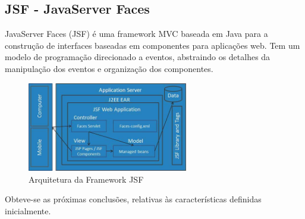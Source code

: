 \subsection{JSF - JavaServer Faces}

JavaServer Faces (JSF) é uma framework MVC baseada em Java para a construção de interfaces baseadas em componentes para aplicações web. Tem um modelo de programação direcionado a eventos, abstraindo os detalhes da manipulação dos eventos e organização dos componentes.

\begin{figure}[ht!]
\centering
\includegraphics[width=70mm]{img/jsf.jpg}
\caption{Arquitetura da Framework JSF}
\end{figure}

Obteve-se as próximas conclusões, relativas às características definidas inicialmente.

